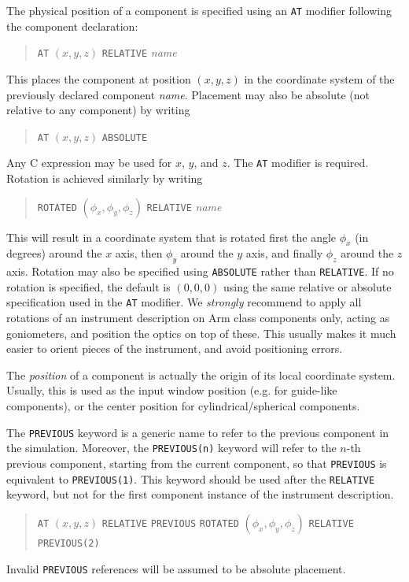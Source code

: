 The physical position of a component is specified using an \texttt{AT} modifier
following the component declaration:
  
\begin{quote}
  \texttt{AT} $(x,y,z)$ \texttt{RELATIVE} \textit{name}
\end{quote}
This places the component at position $(x,y,z)$ in the coordinate system
of the previously declared component \textit{name}. Placement may also
be absolute (not relative to any component) by writing
\begin{quote}
  \texttt{AT} $(x,y,z)$ \texttt{ABSOLUTE}
\end{quote}
Any C expression may be used for $x$, $y$, and $z$. The \texttt{AT}
modifier is required.
Rotation is achieved similarly by writing 
\begin{quote}
  \texttt{ROTATED} $(\phi_x,\phi_y,\phi_z)$ \texttt{RELATIVE} \textit{name}
\end{quote}
This will result in a coordinate system that is rotated first the angle $\phi_x$
(in degrees) around the $x$ axis, then $\phi_y$ around the $y$ axis, and finally
$\phi_z$ around the $z$ axis. Rotation may also be specified using
\texttt{ABSOLUTE} rather than \texttt{RELATIVE}. If no rotation is specified,
the default is $(0,0,0)$ using the same relative or absolute specification used
in the \texttt{AT} modifier. We \emph{strongly} recommend to apply all rotations
of an instrument description on Arm class components only, acting as
goniometers, and position the optics on top of these. This usually makes it much
easier to orient pieces of the instrument, and avoid positioning errors.

The \emph{position} of
a component is actually the origin of its local coordinate
system. Usually, this is used as the input window position (e.g. for
guide-like components), or the center position for
cylindrical/spherical components.

The \texttt{PREVIOUS}  keyword is a generic name to
refer to the previous component in the simulation. Moreover, the
\texttt{PREVIOUS(n)} keyword will refer to the $n$-th previous component,
starting from the current component, so that \texttt{PREVIOUS} is equivalent to
\texttt{PREVIOUS(1)}. This keyword should be used after the \texttt{RELATIVE}
keyword, but not for the first component instance of the instrument description.
\begin{quote}
  \texttt{AT} $(x,y,z)$ \texttt{RELATIVE} \texttt{PREVIOUS}
  \texttt{ROTATED} $(\phi_x,\phi_y,\phi_z)$ \texttt{RELATIVE} \texttt{PREVIOUS(2)}
\end{quote}
Invalid \texttt{PREVIOUS} references will be assumed to be absolute placement.

